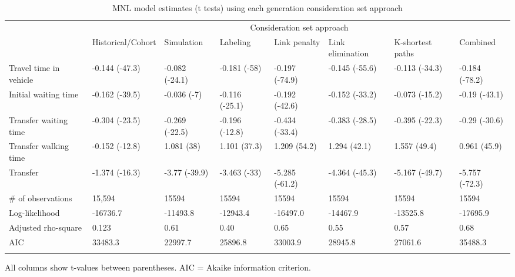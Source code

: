 \documentclass[12pt,a4paper]{article}
\begin{document}
\begin{landscape}
\begin{table}[]
\centering
\footnotesize\setlength\tabcolsep{3 pt}
\caption{MNL model estimates (t tests) using each generation consideration set approach}
\label{tab:mnlmodel}  
\begin{tabular}{llllllll}
\hline\noalign{\smallskip}
\multicolumn{1}{c}{\multirow{2}{*}{Parameters}} & \multicolumn{7}{c}{Consideration set approach}                                                                              \\
\multicolumn{1}{c}{}                            & Historical/Cohort & Simulation     & Labeling       & Link penalty   & Link elimination & K-shortest paths & Combined       \\
\noalign{\smallskip}\hline\noalign{\smallskip}
Travel time in vehicle                          & -0.144 (-47.3)    & -0.082 (-24.1) & -0.181 (-58)   & -0.197 (-74.9) & -0.145 (-55.6)   & -0.113 (-34.3)   & -0.184 (-78.2) \\
Initial waiting time                            & -0.162 (-39.5)    & -0.036 (-7)    & -0.116 (-25.1) & -0.192 (-42.6) & -0.152 (-33.2)   & -0.073 (-15.2)   & -0.19 (-43.1)  \\
Transfer waiting time                           & -0.304 (-23.5)    & -0.269 (-22.5) & -0.196 (-12.8) & -0.434 (-33.4) & -0.383 (-28.5)   & -0.395 (-22.3)   & -0.29 (-30.6)  \\
Transfer walking time                           & -0.152 (-12.8)    & 1.081 (38)     & 1.101 (37.3)   & 1.209 (54.2)   & 1.294 (42.1)     & 1.557 (49.4)     & 0.961 (45.9)   \\
Transfer                                        & -1.374 (-16.3)    & -3.77 (-39.9)  & -3.463 (-33)   & -5.285 (-61.2) & -4.364 (-45.3)   & -5.167 (-49.7)   & -5.757 (-72.3) \\
\# of observations                              & 15,594            & 15594          & 15594          & 15594          & 15594            & 15594            & 15594          \\
Log-likelihood                                  & -16736.7          & -11493.8       & -12943.4       & -16497.0       & -14467.9         & -13525.8         & -17695.9       \\
Adjusted rho-square                             & 0.123             & 0.61           & 0.40           & 0.65           & 0.55             & 0.57             & 0.68           \\
AIC                                             & 33483.3           & 22997.7        & 25896.8        & 33003.9        & 28945.8          & 27061.6          & 35488.3     \\
\noalign{\smallskip}\hline
\end{tabular}
\vskip 0.05cm
\footnotesize{All columns show t-values between parentheses. AIC = Akaike information criterion.}
\end{table}


\end{landscape}
\end{document}
